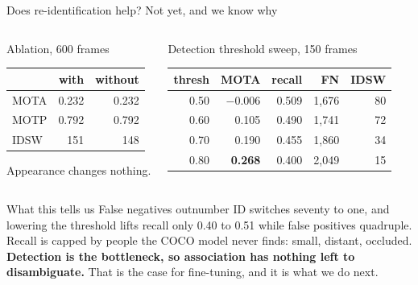 \documentclass[aspectratio=169,11pt]{beamer}
\begin{document}
\begin{frame}{Does re-identification help? Not yet, and we know why}
  \begin{columns}[T,onlytextwidth]
      \begin{block}{Ablation, 600 frames}
        {\footnotesize
        \begin{tabular}{lrr}
          \toprule
                & with & without \\
          \midrule
          MOTA  & 0.232 & 0.232 \\
          MOTP  & 0.792 & 0.792 \\
          IDSW  & 151   & 148 \\
          \bottomrule
        \end{tabular}}
        \vspace{0.3em}

        {\footnotesize Appearance changes nothing.}
      \end{block}
      \begin{block}{Detection threshold sweep, 150 frames}
        {\footnotesize
        \begin{tabular}{rrrrr}
          \toprule
          thresh & MOTA & recall & FN & IDSW \\
          \midrule
          0.50 & $-$0.006 & 0.509 & 1{,}676 & 80 \\
          0.60 & 0.105 & 0.490 & 1{,}741 & 72 \\
          0.70 & 0.190 & 0.455 & 1{,}860 & 34 \\
          0.80 & \textbf{0.268} & 0.400 & 2{,}049 & 15 \\
          \bottomrule
        \end{tabular}}
      \end{block}
  \end{columns}
  \vspace{0.6em}

  \begin{alertblock}{What this tells us}
    {\footnotesize False negatives outnumber ID switches seventy to one, and
    lowering the threshold lifts recall only 0.40 to 0.51 while false positives
    quadruple. Recall is capped by people the COCO model never finds: small,
    distant, occluded. \textbf{Detection is the bottleneck, so association has
    nothing left to disambiguate.} That is the case for fine-tuning, and it is
    what we do next.}
  \end{alertblock}
\end{frame}
\end{document}
